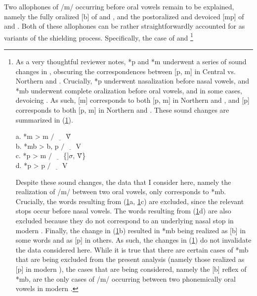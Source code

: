 \documentclass[output=paper,hidelinks]{langscibook}
\begin{document}
Two allophones of /m/ occurring before oral vowels remain to be explained, namely the fully oralized [b] of  and , and the postoralized and devoiced [mp] of  and . Both of these allophones can be rather straightforwardly accounted for as variants of the shielding process. Specifically, the case of  and \footnote{As a very thoughtful reviewer notes,  *p and *m underwent a series of sound changes in , obscuring the correspondences between [p, m] in Central vs. Northern and . Crucially, *p underwent nasalization before nasal vowels, and *mb underwent complete oralization before oral vowels, and in some cases, devoicing \citep{Davis1966}. As such,  [m] corresponds to both [p, m] in Northern and , and  [p] corresponds to both [p, m] in Northern and . These sound changes are summarized in (\ref{aaa}).


\begin{multicols}{2}
\ea\label{aaa} a. *m >  m $/$ $\underline{\hspace{1em}}$ \~V \\
		b. *mb >  b, p $/$ $\underline{\hspace{1em}}$ V \\
		c. *p >  m $/$ $\underline{\hspace{1em}}$ \{]$\sigma$, \~V\} \\
		d. *p >  p $/$ $\underline{\hspace{1em}}$ V
		\z
\end{multicols}


Despite these sound changes, the data that I consider here, namely the realization of /m/ between two oral vowels, only corresponds to  *mb. Crucially, the words resulting from (\ref{aaa}a, \ref{aaa}c) are excluded, since the relevant stops occur before nasal vowels. The words resulting from (\ref{aaa}d) are also excluded because they do not correspond to an underlying nasal stop in modern . Finally, the change in (\ref{aaa}b) resulted in *mb being realized as [b] in some words and as [p] in others. As such, the changes in (\ref{aaa}) do not invalidate the data considered here. While it is true that there are certain cases of  *mb that are being excluded from the present analysis (namely those realized as [p] in modern ), the cases that are being considered, namely the [b] reflex of  *mb, are the only cases of /m/ occurring between two phonemically oral vowels in modern .

}
\end{document}
